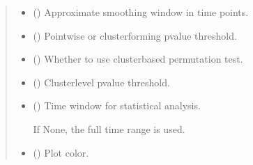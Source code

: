 \documentclass[letterpaper,10pt,english]{sphinxhowto}
\begin{document}
\begin{fulllineitems}
\begin{quote}
\begin{description}
\begin{itemize}
\item {} 
\sphinxAtStartPar
{} (\sphinxstyleliteralemphasis{\sphinxupquote{, }}) \textendash{} Approximate smoothing window in time points.

\item {} 
\sphinxAtStartPar
{} (\sphinxstyleliteralemphasis{\sphinxupquote{, }}) \textendash{} Point\sphinxhyphen{}wise or cluster\sphinxhyphen{}forming p\sphinxhyphen{}value threshold.

\item {} 
\sphinxAtStartPar
{} (\sphinxstyleliteralemphasis{\sphinxupquote{, }}) \textendash{} Whether to use cluster\sphinxhyphen{}based permutation test.

\item {} 
\sphinxAtStartPar
{} (\sphinxstyleliteralemphasis{\sphinxupquote{, }}) \textendash{} Cluster\sphinxhyphen{}level p\sphinxhyphen{}value threshold.

\item {} 
\sphinxAtStartPar
{} (\sphinxstyleliteralemphasis{\sphinxupquote{, }}) \textendash{} 
\sphinxAtStartPar
Time window for statistical analysis.

\sphinxAtStartPar
If None, the full time range is used.


\item {} 
\sphinxAtStartPar
{} (\sphinxstyleliteralemphasis{\sphinxupquote{, }}) \textendash{} Plot color.


\end{itemize}
\end{description}
\end{quote}
\end{fulllineitems}
\end{document}
